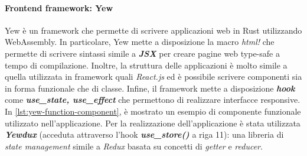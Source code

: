 \documentclass{article}
\begin{document}
\paragraph{Frontend framework: Yew} Yew è un framework che permette di scrivere applicazioni 
web in Rust utilizzando WebAssembly. In particolare, Yew mette a disposizione la macro 
\textit{html!} che permette di scrivere sintassi simile a \textbf{\textit{JSX}} per creare 
pagine web type-safe a tempo di compilazione. Inoltre, la struttura delle applicazioni è molto 
simile a quella utilizzata in framework quali \textit{React.js} ed è possibile scrivere 
componenti sia in forma funzionale che di classe. Infine, il framework mette a disposizione
\textbf{\textit{hook}} come \textbf{\textit{use\_state, use\_effect}} che permettono di 
realizzare interfacce responsive. In \cref{lst:yew-function-component}, è mostrato un esempio di componente funzionale utilizzato 
nell'applicazione. Per la realizzazione dell'applicazione è stata utilizzata \textbf{\textit{Yewdux}}
(acceduta attraverso l'hook \textbf{\textit{use\_store()}} a riga 11):
una libreria di \textit{state management} simile a \textit{Redux} basata su concetti di 
\textit{getter} e \textit{reducer}.
\end{document}
